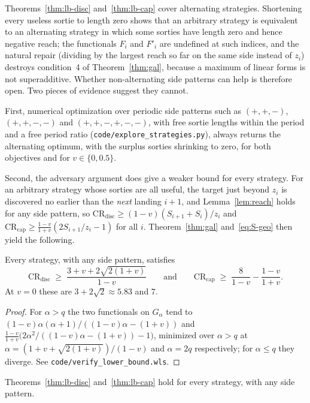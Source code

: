 \documentclass[runningheads,envcountsame,envcountsect]{llncs}
\newcommand{\CR}{\mathrm{CR}}
\newcommand{\disc}{\mathrm{disc}}
\newcommand{\capt}{\mathrm{cap}}
\begin{document}
Theorems~\ref{thm:lb-disc} and~\ref{thm:lb-cap} cover alternating strategies. Shortening every useless sortie to length zero shows that an arbitrary strategy is equivalent to an alternating strategy in which some sorties have length zero and hence negative reach; the functionals $F_i$ and $F'_i$ are undefined at such indices, and the natural repair (dividing by the largest reach so far on the same side instead of $z_i$) destroys condition~4 of Theorem~\ref{thm:gal}, because a maximum of linear forms is not superadditive. Whether non-alternating side patterns can help is therefore open. Two pieces of evidence suggest they cannot.

First, numerical optimization over periodic side patterns such as $(+,+,-)$, $(+,+,-,-)$ and $(+,+,-,+,-,-)$, with free sortie lengths within the period and a free period ratio (\texttt{code/explore\_strategies.py}), always returns the alternating optimum, with the surplus sorties shrinking to zero, for both objectives and for $v \in \{0, 0.5\}$.

Second, the adversary argument does give a weaker bound for every strategy. For an arbitrary strategy whose sorties are all useful, the target just beyond $z_i$ is discovered no earlier than the \emph{next} landing $i+1$, and Lemma~\ref{lem:reach} holds for any side pattern, so $\CR_{\disc} \geq (1-v)(S_{i+1} + S_i)/z_i$ and $\CR_{\capt} \geq \frac{1-v}{1+v}(2S_{i+1}/z_i - 1)$ for all $i$. Theorem~\ref{thm:gal} and~\eqref{eq:S-geo} then yield the following.

\begin{theorem}\label{thm:lb-universal}
Every strategy, with any side pattern, satisfies
\[
  \CR_{\disc} \;\geq\; \frac{3 + v + 2\sqrt{2(1+v)}}{1-v}
  \qquad\text{and}\qquad
  \CR_{\capt} \;\geq\; \frac{8}{1-v} - \frac{1-v}{1+v} .
\]
At $v = 0$ these are $3 + 2\sqrt2 \approx 5.83$ and $7$.
\end{theorem}
\begin{proof}
For $\alpha > q$ the two functionals on $G_\alpha$ tend to $(1-v)\alpha(\alpha+1)/((1-v)\alpha - (1+v))$ and $\frac{1-v}{1+v}\big(2\alpha^2/((1-v)\alpha - (1+v)) - 1\big)$, minimized over $\alpha > q$ at $\alpha = (1 + v + \sqrt{2(1+v)})/(1-v)$ and $\alpha = 2q$ respectively; for $\alpha \leq q$ they diverge. See \texttt{code/verify\_lower\_bound.wls}.
\end{proof}

\begin{conjecture}\label{conj:alternating}
Theorems~\ref{thm:lb-disc} and~\ref{thm:lb-cap} hold for every strategy, with any side pattern.
\end{conjecture}
\end{document}
